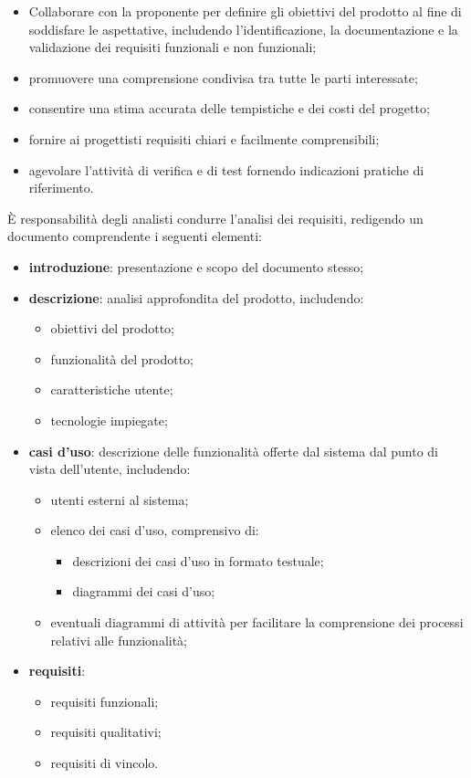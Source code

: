 \begin{itemize}
	\item Collaborare con la proponente per definire gli obiettivi del prodotto al fine di soddisfare le aspettative, includendo l'identificazione, la documentazione e la validazione dei requisiti funzionali e non funzionali;
	\item promuovere una comprensione condivisa tra tutte le parti interessate;
	\item consentire una stima accurata delle tempistiche e dei costi del progetto;
	\item fornire ai progettisti requisiti chiari e facilmente comprensibili;
	\item agevolare l'attività di verifica e di test fornendo indicazioni pratiche di riferimento.
\end{itemize}
\newpage
{}
È responsabilità degli analisti condurre l'analisi dei requisiti, redigendo un documento comprendente i seguenti elementi:
\begin{itemize}
	\item \textbf{introduzione}: presentazione e scopo del documento stesso;
	\item \textbf{descrizione}:  analisi approfondita del prodotto, includendo:
	      \begin{itemize}
		      \item obiettivi del prodotto;
		      \item funzionalità del prodotto;
		      \item caratteristiche utente;
		      \item tecnologie impiegate;
	      \end{itemize}
	\item \textbf{casi d'uso}: descrizione delle funzionalità offerte dal sistema dal punto di vista dell'utente, includendo:
	      \begin{itemize}
		      \item utenti esterni al sistema;
		      \item elenco dei casi d'uso, comprensivo di:
		            \begin{itemize}
			            \item descrizioni dei casi d'uso in formato testuale;
			            \item diagrammi dei casi d'uso;
		            \end{itemize}
		      \item eventuali diagrammi di attività per facilitare la comprensione dei processi relativi alle funzionalità;
	      \end{itemize}
	\item \textbf{requisiti}:
	      \begin{itemize}
		      \item requisiti funzionali;
		      \item requisiti qualitativi;
		      \item requisiti di vincolo.
	      \end{itemize}
\end{itemize}

